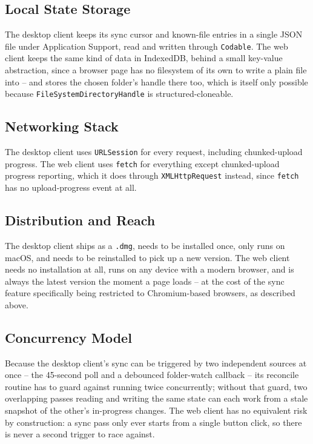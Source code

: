 \documentclass[12pt,a4paper]{article}
\begin{document}
\subsection{Local State Storage}

The desktop client keeps its sync cursor and known-file entries in a single JSON file under Application Support, read and written through \texttt{Codable}. The web client keeps the same kind of data in IndexedDB, behind a small key-value abstraction, since a browser page has no filesystem of its own to write a plain file into -- and stores the chosen folder's handle there too, which is itself only possible because \texttt{FileSystemDirectoryHandle} is structured-cloneable.

\subsection{Networking Stack}

The desktop client uses \texttt{URLSession} for every request, including chunked-upload progress. The web client uses \texttt{fetch} for everything except chunked-upload progress reporting, which it does through \texttt{XMLHttpRequest} instead, since \texttt{fetch} has no upload-progress event at all.

\subsection{Distribution and Reach}

The desktop client ships as a \texttt{.dmg}, needs to be installed once, only runs on macOS, and needs to be reinstalled to pick up a new version. The web client needs no installation at all, runs on any device with a modern browser, and is always the latest version the moment a page loads -- at the cost of the sync feature specifically being restricted to Chromium-based browsers, as described above.

\subsection{Concurrency Model}

Because the desktop client's sync can be triggered by two independent sources at once -- the 45-second poll and a debounced folder-watch callback -- its reconcile routine has to guard against running twice concurrently; without that guard, two overlapping passes reading and writing the same state can each work from a stale snapshot of the other's in-progress changes. The web client has no equivalent risk by construction: a sync pass only ever starts from a single button click, so there is never a second trigger to race against.
\end{document}
